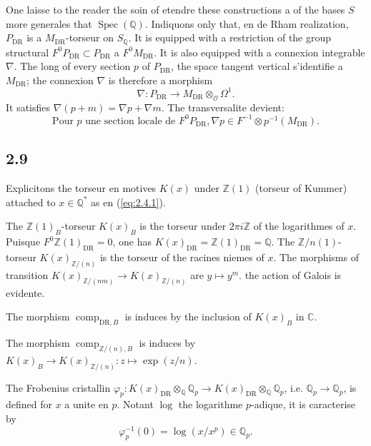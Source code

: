 \documentclass[12pt,a4paper]{article}
\theoremstyle{plain}
\theoremstyle{definition}
\theoremstyle{remark}
\DeclareMathOperator{\Spec}{Spec}
\providecommand{\Spec}{\operatorname{Spec}}
\providecommand{\DR}{\mathrm{DR}}
\providecommand{\comp}{\operatorname{comp}}
\begin{document}
One laisse to the reader the soin of etendre these constructions a of the bases $S$ more
generales that $\Spec(\mathbb{Q})$. Indiquons only that, en de Rham realization,
$P_{\DR}$ is a $M_{\DR}$-torseur on $S_\mathbb{Q}$. It is equipped with a restriction of the
group structural $F^0 P_{\DR} \subset P_{\DR}$ a $F^0 M_{\DR}$. It is also equipped with a
connexion integrable $\nabla$. The long of every section $p$ of $P_{\DR}$, the space
tangent vertical s'identifie a $M_{\DR}$; the connexion $\nabla$ is therefore a morphism
\[
\nabla: P_{\DR} \longrightarrow M_{\DR} \otimes_{\mathcal{O}} \Omega^1.
\]
It satisfies $\nabla(p + m) = \nabla p + \nabla m$. The transversalite devient:
\begin{equation}\label{eq:2.8.1}
\text{Pour } p \text{ une section locale de } F^0 P_{\DR}, \nabla p \in F^{-1}
\otimes p^{-1}(M_{\DR}).
\end{equation}

\subsection*{2.9}

Explicitons the torseur en motives $K(x)$ under $\mathbb{Z}(1)$ (torseur of Kummer)
attached to $x \in \mathbb{Q}^*$ as en (\ref{eq:2.4.1}).

The $\mathbb{Z}(1)_B$-torseur $K(x)_B$ is the torseur under $2\pi i \mathbb{Z}$ of the
logarithmes of $x$. Puisque $F^0 \mathbb{Z}(1)_{\DR} = 0$, one has $K(x)_{\DR} =
\mathbb{Z}(1)_{\DR} = \mathbb{Q}$. The $\mathbb{Z}/n(1)$-torseur
$K(x)_{\mathbb{Z}/(n)}$ is the torseur of the racines niemes of $x$. The morphisms of
transition $K(x)_{\mathbb{Z}/(nm)} \to K(x)_{\mathbb{Z}/(n)}$ are $y \mapsto y^m$.
the action of Galois is evidente.

The morphism $\comp_{\DR,B}$ is induces by the inclusion of $K(x)_B$ in $\mathbb{C}$.

The morphism $\comp_{\mathbb{Z}/(n),B}$ is induces by $K(x)_B \to
K(x)_{\mathbb{Z}/(n)}: z \mapsto \exp(z/n)$.

The Frobenius cristallin $\varphi_p: K(x)_{\DR} \otimes_{\mathbb{Q}} \mathbb{Q}_p \to
K(x)_{\DR} \otimes_{\mathbb{Q}} \mathbb{Q}_p$, i.e. $\mathbb{Q}_p \to \mathbb{Q}_p$, is
defined for $x$ a unite en $p$. Notant $\log$ the logarithme $p$-adique, it is
caracterise by
\begin{equation}\label{eq:2.9}
\varphi_p^{-1}(0) = \log(x/x^p) \in \mathbb{Q}_p.
\end{equation}
\end{document}
